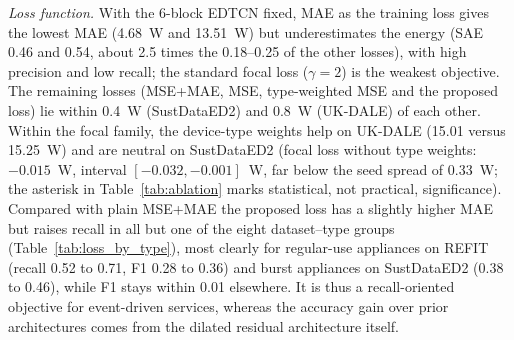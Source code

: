 \documentclass[fleqn,10pt]{wlscirep}
\begin{document}
\textit{Loss function.} With the 6-block EDTCN fixed, MAE as the training loss gives the lowest MAE (4.68~W and 13.51~W) but underestimates the energy (SAE 0.46 and 0.54, about 2.5 times the 0.18--0.25 of the other losses), with high precision and low recall; the standard focal loss ($\gamma=2$) is the weakest objective. The remaining losses (MSE+MAE, MSE, type-weighted MSE and the proposed loss) lie within 0.4~W (SustDataED2) and 0.8~W (UK-DALE) of each other. Within the focal family, the device-type weights help on UK-DALE (15.01 versus 15.25~W) and are neutral on SustDataED2 (focal loss without type weights: $-0.015$~W, interval $[-0.032,-0.001]$~W, far below the seed spread of 0.33~W; the asterisk in Table~\ref{tab:ablation} marks statistical, not practical, significance). Compared with plain MSE+MAE the proposed loss has a slightly higher MAE but raises recall in all but one of the eight dataset--type groups (Table~\ref{tab:loss_by_type}), most clearly for regular-use appliances on REFIT (recall 0.52 to 0.71, F1 0.28 to 0.36) and burst appliances on SustDataED2 (0.38 to 0.46), while F1 stays within 0.01 elsewhere. It is thus a recall-oriented objective for event-driven services, whereas the accuracy gain over prior architectures comes from the dilated residual architecture itself.
\end{document}

